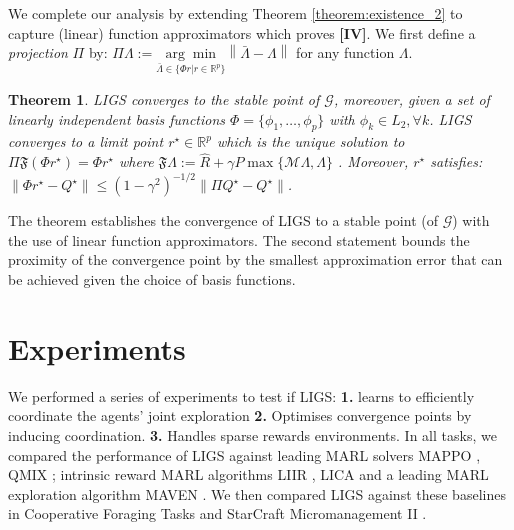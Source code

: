 \documentclass{article}
\newtheorem{theorem}{Theorem}
\begin{document}
% 
We complete our analysis by extending Theorem \ref{theorem:existence_2} to capture (linear) function approximators which proves \textbf{[IV]}. We first define a \textit{projection} $\Pi$ by: $
\Pi \Lambda:=\underset{\bar{\Lambda}\in\{\Phi r|r\in\mathbb{R}^p\}}{\arg\min}\left\|\bar{\Lambda}-\Lambda\right\|$ for any function $\Lambda$.
% 
%     
\begin{theorem}\label{primal_convergence_theorem}
LIGS converges to the stable point of  $\mathcal{G}$, 
moreover, given a set of linearly independent basis functions $\Phi=\{\phi_1,\ldots,\phi_p\}$ with $\phi_k\in L_2,\forall k$. LIGS converges to a limit point $r^\star\in\mathbb{R}^p$ which is the unique solution to  $\Pi \mathfrak{F} (\Phi r^\star)=\Phi r^\star$ where
    $\mathfrak{F}\Lambda:=\hat{R}+\gamma P \max\{\mathcal{M}\Lambda,\Lambda\}$ . Moreover, $r^\star$ satisfies: $
    \left\|\Phi r^\star - Q^\star\right\|\leq (1-\gamma^2)^{-1/2}\left\|\Pi Q^\star-Q^\star\right\|$.
\end{theorem}
The theorem establishes the convergence of LIGS to a stable point (of $\mathcal{G}$) with the use of linear function approximators. The second statement bounds the proximity of the convergence point by the smallest approximation error that can be achieved given the choice of basis functions. 

\section{Experiments}\label{Section:Experiments}
We performed a series of experiments to test if LIGS: \textbf{1.} learns to efficiently coordinate the agents' joint exploration \textbf{2.} Optimises convergence points by inducing coordination. \textbf{3.} Handles sparse rewards environments. In all tasks, we compared the performance of LIGS against leading MARL solvers MAPPO \cite{yu2021surprising}, QMIX \cite{rashid2018qmix}; intrinsic reward MARL algorithms LIIR \cite{du2019liir}, LICA \cite{zhou2020learning} and a leading MARL exploration algorithm MAVEN \cite{mahajan2019maven}.
We then compared LIGS against these baselines in Cooperative Foraging Tasks \cite{papoudakis2020comparative} and StarCraft Micromanagement II \cite{samvelyan2019starcraft}.
\end{document}
